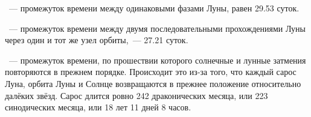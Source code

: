 \begin{figure}[h!]
    \caption{}
    \label{pic:eclipses-semi-shadow-lunar-eclipse}    
\end{figure}


~--- промежуток времени между одинаковыми фазами Луны, равен 29.53 суток.

~--- промежуток времени между двумя последовательными прохождениями Луны через один и тот же узел орбиты,~--- 27.21 суток.

~--- промежуток  времени, по прошествии которого солнечные и лунные затмения повторяются в прежнем порядке. Происходит это из-за того, что каждый сарос Луна, орбита Луны и Солнце возвращаются в прежнее положение относительно далёких звёзд. Сарос длится ровно 242 драконических месяца, или 223 синодических месяца, или 18 лет 11 дней 8 часов.


